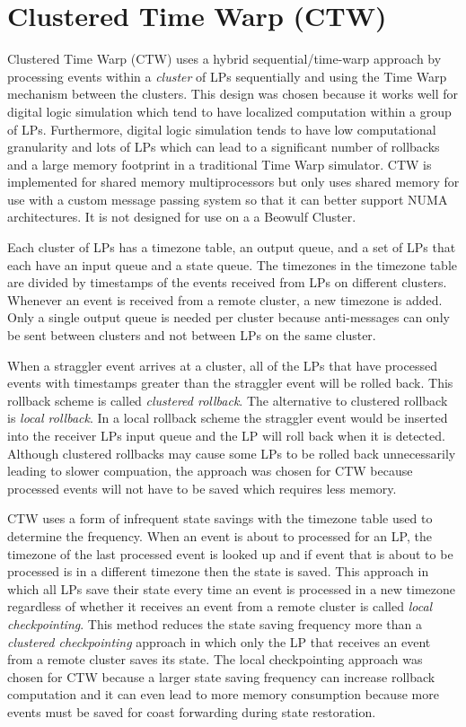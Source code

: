 \documentclass[11pt]{book}
\begin{document}
\section{Clustered Time Warp (CTW)}

Clustered Time Warp \cite{avril-95} (CTW) uses a hybrid sequential/time-warp approach by processing
events within a \emph{cluster} of LPs sequentially and using the Time Warp mechanism between the
clusters.  This design was chosen because it works well for digital logic simulation which tend to
have localized computation within a group of LPs.  Furthermore, digital logic simulation tends to
have low computational granularity and lots of LPs which can lead to a significant number of
rollbacks and a large memory footprint in a traditional Time Warp simulator.  CTW is implemented for
shared memory multiprocessors but only uses shared memory for use with a custom message passing
system so that it can better support NUMA architectures.  It is not designed for use on a a Beowulf
Cluster.

Each cluster of LPs has a timezone table, an output queue, and a set of LPs that each have an input
queue and a state queue.  The timezones in the timezone table are divided by timestamps of the
events received from LPs on different clusters.  Whenever an event is received from a remote
cluster, a new timezone is added.  Only a single output queue is needed per cluster because
anti-messages can only be sent between clusters and not between LPs on the same cluster.

When a straggler event arrives at a cluster, all of the LPs that have processed events with
timestamps greater than the straggler event will be rolled back.  This rollback scheme is called
\emph{clustered rollback}.  The alternative to clustered rollback is \emph{local rollback}.  In a
local rollback scheme the straggler event would be inserted into the receiver LPs input queue and
the LP will roll back when it is detected.  Although clustered rollbacks may cause some LPs to be
rolled back unnecessarily leading to slower compuation, the approach was chosen for CTW because
processed events will not have to be saved which requires less memory.

CTW uses a form of infrequent state savings with the timezone table used to determine the frequency.
When an event is about to processed for an LP, the timezone of the last processed event is looked up
and if event that is about to be processed is in a different timezone then the state is saved.  This
approach in which all LPs save their state every time an event is processed in a new timezone
regardless of whether it receives an event from a remote cluster is called \emph{local
  checkpointing}.  This method reduces the state saving frequency more than a \emph{clustered
  checkpointing} approach in which only the LP that receives an event from a remote cluster saves
its state.  The local checkpointing approach was chosen for CTW because a larger state saving
frequency can increase rollback computation and it can even lead to more memory consumption because
more events must be saved for coast forwarding during state restoration.
\end{document}
